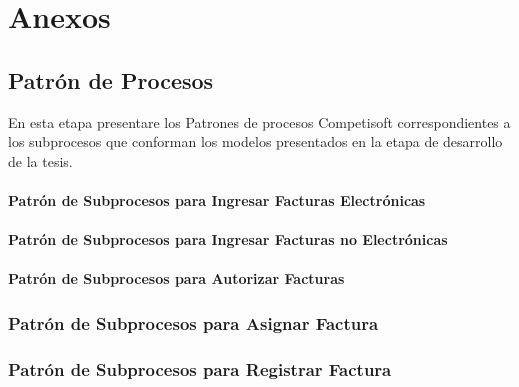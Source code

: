 \chapter{Anexos}
\newpage

	\section{Patrón de Procesos}
	En esta etapa presentare los Patrones de procesos Competisoft correspondientes a los subprocesos que conforman los modelos presentados en la etapa de desarrollo de la tesis.
	
	\subsubsection{Patrón de Subprocesos para Ingresar Facturas Electrónicas}
		
	
	\newpage
	\subsubsection{Patrón de Subprocesos para Ingresar Facturas no Electrónicas} 
		
	
	\newpage
	\subsubsection{Patrón de Subprocesos para Autorizar Facturas}
		
		
	\subsection{Patrón de Subprocesos para Asignar Factura}
		
		
	\subsection{Patrón de Subprocesos para Registrar Factura}
		
		
